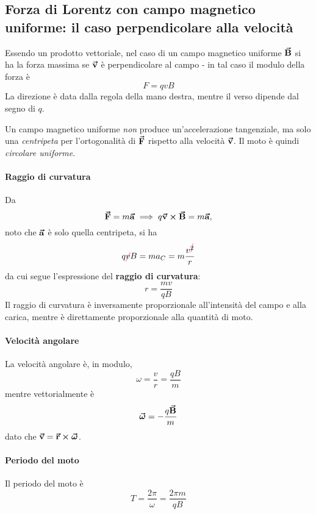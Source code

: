 \subsection{Forza di Lorentz con campo magnetico uniforme: il caso perpendicolare alla velocità}
Essendo un prodotto vettoriale, nel caso di un campo magnetico uniforme $\vb*{\va{B}}$ si ha la forza massima se $\vb*{\va{v}}$ è perpendicolare al campo - in tal caso il modulo della forza è
\begin{equation*}
	F=qvB
\end{equation*}
La direzione è data dalla regola della mano destra, mentre il verso dipende dal segno di $q$.\\
\begin{observe}
	Un campo magnetico uniforme \textit{non} produce un'accelerazione tangenziale, ma solo una \textit{centripeta} per l'ortogonalità di $\vb*{\va{F}}$ rispetto alla velocità $\vb*{\va{v}}$. Il moto è quindi \textit{circolare uniforme}. 
\end{observe}
\paragraph{Raggio di curvatura}
Da
\begin{equation*}
	\vb*{\va{F}}=m\vb*{\va{a}}\implies q\vb*{\va{v}}\cross\vb*{\va{B}}=m\vb*{\va{a}},
\end{equation*}
noto che $\vb*{\va{a}}$ è solo quella centripeta, si ha
\begin{equation*}
	q\Ccancel[red]{v}B=ma_C=m\frac{v^{\Ccancel[red]{2}}}{r}
\end{equation*}
da cui segue l'espressione del \textbf{raggio di curvatura}:
\begin{equation}
	r=\frac{mv}{qB}
\end{equation}
Il raggio di curvatura è inversamente proporzionale all'intensità del campo e alla carica, mentre è direttamente proporzionale alla quantità di moto.
\paragraph{Velocità angolare}
La velocità angolare è, in modulo,
\begin{equation}
	\omega=\frac{v}{r}=\frac{qB}{m}
\end{equation}
mentre vettorialmente è
\begin{equation}
	\vb*{\va{\omega}}=-\frac{q\vb*{\va{B}}}{m}
\end{equation}
dato che $\vb*{\va{v}}=\vb*{\va{r}}\cross\vb*{\va{\omega}}$.
\paragraph{Periodo del moto}
Il periodo del moto è
\begin{equation}
	T=\frac{2\pi}{\omega}=\frac{2\pi m}{qB}
\end{equation}
